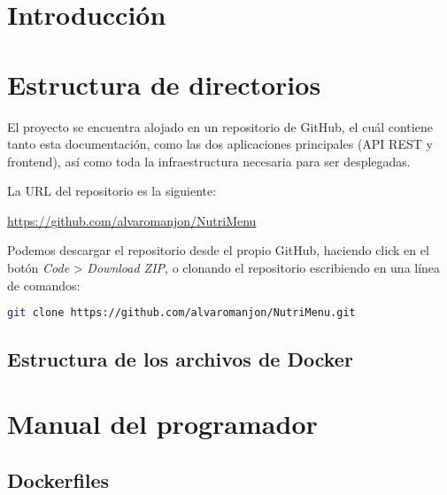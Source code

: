 
\section{Introducción}

\section{Estructura de directorios}

El proyecto se encuentra alojado en un repositorio de GitHub, el cuál contiene tanto esta documentación, como las dos aplicaciones principales (API REST y frontend), así como toda la infraestructura necesaria para ser desplegadas. 

La URL del repositorio es la siguiente:

\href{https://github.com/alvaromanjon/NutriMenu}{https://github.com/alvaromanjon/NutriMenu}


Podemos descargar el repositorio desde el propio GitHub, haciendo click en el botón \textit{Code} > \textit{Download ZIP}, o clonando el repositorio escribiendo en una línea de comandos:

\begin{lstlisting}[language=Bash]
  git clone https://github.com/alvaromanjon/NutriMenu.git
\end{lstlisting}

\subsection{Estructura de los archivos de Docker}


\section{Manual del programador}

\subsection{Dockerfiles}

